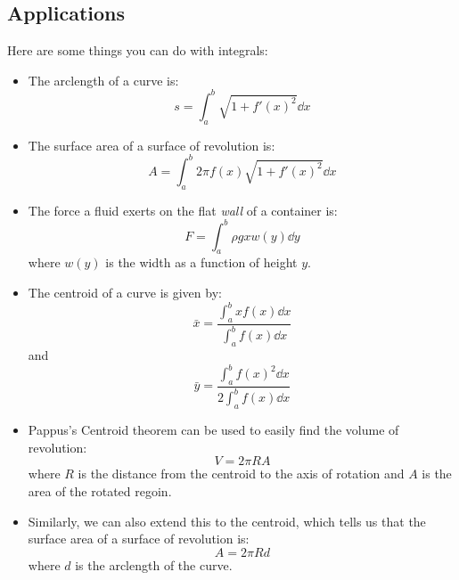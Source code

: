 \documentclass{article}
\begin{document}
    \subsection{Applications}
    Here are some things you can do with integrals:
    \begin{itemize}
        \item The arclength of a curve is:
        \begin{equation}
            s = \int_a^b \sqrt{1+f'(x)^2}\dd{x}
        \end{equation}
        \item The surface area of a surface of revolution is:
        \begin{equation}
            A =\int_a^b 2\pi f(x) \sqrt{1+f'(x)^2}\dd{x}
        \end{equation}
        \item The force a fluid exerts on the flat \textit{wall} of a container is:
        \begin{equation}
            F = \int_a^b \rho gx w(y) \dd{y}
        \end{equation} 
        where $w(y)$ is the width as a function of height $y$.
        \item The centroid of a curve is given by:
        \begin{equation}
            \bar{x} = \frac{\int_a^b xf(x) \dd{x}}{\int_a^b f(x) \dd{x}}
        \end{equation}
        and
        \begin{equation}
            \bar{y} = \frac{\int_a^b f(x)^2\dd{x}}{2\int_a^b f(x) \dd{x}}
        \end{equation}
        \item Pappus's Centroid theorem can be used to easily find the volume of revolution:
        \begin{equation}
            V = 2\pi R A
        \end{equation}
        where $R$ is the distance from the centroid to the axis of rotation and $A$ is the area of the rotated regoin.
        \item Similarly, we can also extend this to the centroid, which tells us that the surface area of a surface of revolution is:
        \begin{equation}
            A = 2\pi R d
        \end{equation}
        where $d$ is the arclength of the curve.
    \end{itemize}
\end{document}
